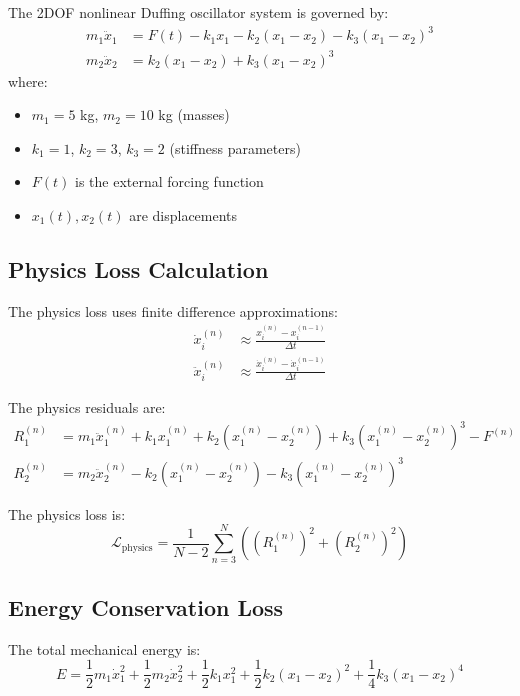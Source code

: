 \documentclass{article}
\begin{document}
The 2DOF nonlinear Duffing oscillator system is governed by:
\begin{align}
m_1 \ddot{x}_1 &= F(t) - k_1 x_1 - k_2(x_1 - x_2) - k_3(x_1 - x_2)^3 \\
m_2 \ddot{x}_2 &= k_2(x_1 - x_2) + k_3(x_1 - x_2)^3
\end{align}
where:
\begin{itemize}
\item $m_1 = 5$ kg, $m_2 = 10$ kg (masses)
\item $k_1 = 1$, $k_2 = 3$, $k_3 = 2$ (stiffness parameters)
\item $F(t)$ is the external forcing function
\item $x_1(t), x_2(t)$ are displacements
\end{itemize}

\subsection{Physics Loss Calculation}

The physics loss uses finite difference approximations:
\begin{align}
\dot{x}_i^{(n)} &\approx \frac{x_i^{(n)} - x_i^{(n-1)}}{\Delta t} \\
\ddot{x}_i^{(n)} &\approx \frac{\dot{x}_i^{(n)} - \dot{x}_i^{(n-1)}}{\Delta t}
\end{align}

The physics residuals are:
\begin{align}
R_1^{(n)} &= m_1 \ddot{x}_1^{(n)} + k_1 x_1^{(n)} + k_2(x_1^{(n)} - x_2^{(n)}) + k_3(x_1^{(n)} - x_2^{(n)})^3 - F^{(n)} \\
R_2^{(n)} &= m_2 \ddot{x}_2^{(n)} - k_2(x_1^{(n)} - x_2^{(n)}) - k_3(x_1^{(n)} - x_2^{(n)})^3
\end{align}

The physics loss is:
\begin{equation}
\mathcal{L}_{\text{physics}} = \frac{1}{N-2} \sum_{n=3}^{N} \left( (R_1^{(n)})^2 + (R_2^{(n)})^2 \right)
\end{equation}

\subsection{Energy Conservation Loss}

The total mechanical energy is:
\begin{equation}
E = \frac{1}{2}m_1\dot{x}_1^2 + \frac{1}{2}m_2\dot{x}_2^2 + \frac{1}{2}k_1 x_1^2 + \frac{1}{2}k_2(x_1-x_2)^2 + \frac{1}{4}k_3(x_1-x_2)^4
\end{equation}
\end{document}
